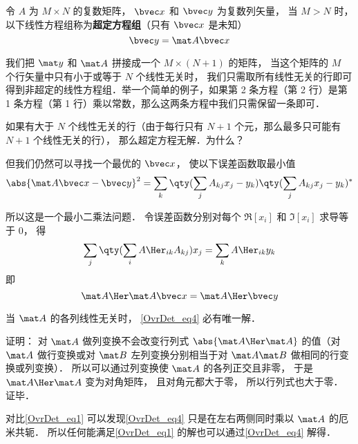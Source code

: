 

令 $A$ 为 $M\times N$ 的复数矩阵， $\bvec x$ 和 $\bvec y$ 为复数列矢量， 当 $M > N$ 时， 以下线性方程组称为\textbf{超定方程组}（只有 $\bvec x$ 是未知）
\begin{equation}\label{OvrDet_eq1}
\bvec y = \mat A \bvec x
\end{equation}

我们把 $\mat y$ 和 $\mat A$ 拼接成一个 $M\times(N+1)$ 的矩阵， 当这个矩阵的 $M$ 个行矢量中只有小于或等于 $N$ 个线性无关时， 我们只需取所有线性无关的行即可得到非超定的线性方程组．举一个简单的例子，如果第 2 条方程（第 2 行）是第 1 条方程（第 1 行）乘以常数，那么这两条方程中我们只需保留一条即可．

如果有大于 $N$ 个线性无关的行（由于每行只有 $N+1$ 个元，那么最多只可能有 $N+1$ 个线性无关的行）， 那么超定方程无解．为什么？


但我们仍然可以寻找一个最优的 $\bvec x$， 使以下误差函数取最小值
\begin{equation}
\abs{\mat A\bvec x - \bvec y}^2 =  \sum_k  \qty(\sum_j A_{kj} x_j - y_k) \qty(\sum_j A_{kj} x_j - y_k)^*
\end{equation}

所以这是一个最小二乘法问题． 令误差函数分别对每个 $\Re[x_i]$ 和 $\Im[x_i]$ 求导等于 0， 得
\begin{equation}
\sum_j \qty(\sum_i A\Her_{ik} A_{kj}) x_j = \sum_k A\Her_{ik} y_k
\end{equation}
即
\begin{equation}\label{OvrDet_eq4}
\mat A\Her \mat A \bvec x = \mat A\Her \bvec y
\end{equation}

\begin{theorem}{}
当 $\mat A$ 的各列线性无关时， \autoref{OvrDet_eq4} 必有唯一解．
\end{theorem}

证明： 对 $\mat A$ 做列变换不会改变行列式 $\abs{\mat A\Her \mat A}$ 的值（对 $\mat A$ 做行变换或对 $\mat B$ 左列变换分别相当于对 $\mat A\mat B$ 做相同的行变换或列变换）． 所以可以通过列变换使 $\mat A$ 的各列正交且非零， 于是 $\mat A\Her \mat A$ 变为对角矩阵， 且对角元都大于零， 所以行列式也大于零． 证毕．

对比\autoref{OvrDet_eq1} 可以发现\autoref{OvrDet_eq4} 只是在左右两侧同时乘以 $\mat A$ 的厄米共轭． 所以任何能满足\autoref{OvrDet_eq1} 的解也可以通过\autoref{OvrDet_eq4} 解得．
